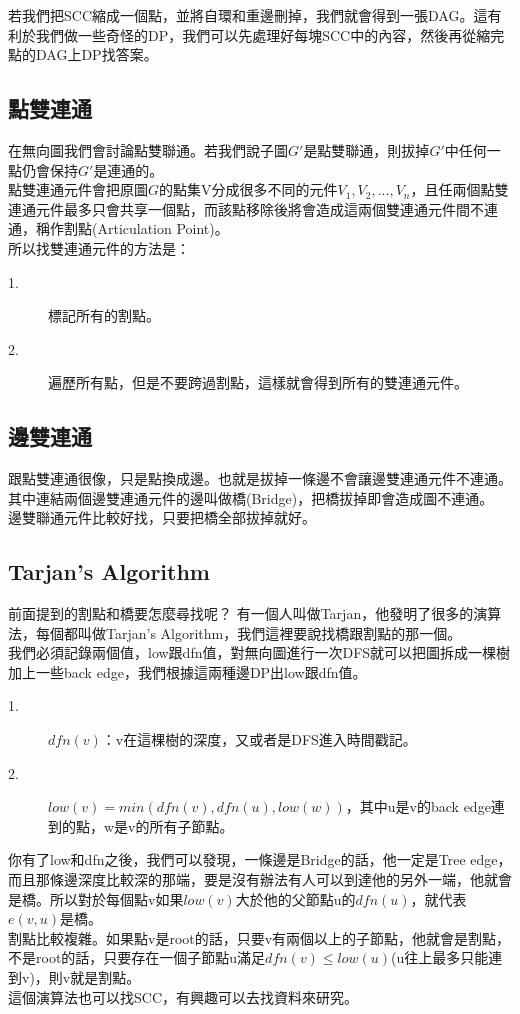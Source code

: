 \documentclass{article}
\begin{document}
若我們把SCC縮成一個點，並將自環和重邊刪掉，我們就會得到一張DAG。這有利於我們做一些奇怪的DP，我們可以先處理好每塊SCC中的內容，然後再從縮完點的DAG上DP找答案。

\subsection{點雙連通}
在無向圖我們會討論點雙聯通。若我們說子圖$G'$是點雙聯通，則拔掉$G'$中任何一點仍會保持$G'$是連通的。\\
點雙連通元件會把原圖$G$的點集V分成很多不同的元件$V_1,V_2,...,V_n$，且任兩個點雙連通元件最多只會共享一個點，而該點移除後將會造成這兩個雙連通元件間不連通，稱作割點(Articulation Point)。\\
所以找雙連通元件的方法是：
\begin{description}
\item[ 1.]標記所有的割點。
\item[ 2.]遍歷所有點，但是不要跨過割點，這樣就會得到所有的雙連通元件。
\end{description}

\subsection{邊雙連通}
跟點雙連通很像，只是點換成邊。也就是拔掉一條邊不會讓邊雙連通元件不連通。\\
其中連結兩個邊雙連通元件的邊叫做橋(Bridge)，把橋拔掉即會造成圖不連通。\\
邊雙聯通元件比較好找，只要把橋全部拔掉就好。

\subsection{Tarjan's Algorithm}
前面提到的割點和橋要怎麼尋找呢？
有一個人叫做Tarjan，他發明了很多的演算法，每個都叫做Tarjan's Algorithm，我們這裡要說找橋跟割點的那一個。\\
我們必須記錄兩個值，low跟dfn值，對無向圖進行一次DFS就可以把圖拆成一棵樹加上一些back edge，我們根據這兩種邊DP出low跟dfn值。
\begin{description}
\item[ 1.]$dfn(v)$：v在這棵樹的深度，又或者是DFS進入時間戳記。
\item[ 2.]$low(v) = min(dfn(v),dfn(u),low(w))$，其中u是v的back edge連到的點，w是v的所有子節點。
\end{description}
你有了low和dfn之後，我們可以發現，一條邊是Bridge的話，他一定是Tree edge，而且那條邊深度比較深的那端，要是沒有辦法有人可以到達他的另外一端，他就會是橋。所以對於每個點v如果$low(v)$大於他的父節點u的$dfn(u)$，就代表$e(v,u)$是橋。\\[2em]
割點比較複雜。如果點v是root的話，只要v有兩個以上的子節點，他就會是割點，不是root的話，只要存在一個子節點u滿足$dfn(v) \leq low(u)$(u往上最多只能連到v)，則v就是割點。\\[2em]
這個演算法也可以找SCC，有興趣可以去找資料來研究。
\end{document}

